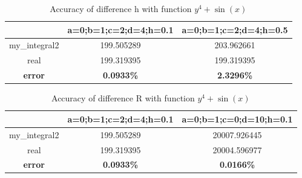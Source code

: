 \documentclass[
	12pt, %
]{fphw}
\numberwithin{equation}{section}
\numberwithin{figure}{section}
\numberwithin{table}{section}
\begin{document}
\begin{table}
	\centering
	\caption{Accuracy of difference h with function $y^4+\sin(x)$}
	\label{table1}
	\begin{tabular}{ccc}
		\toprule
		               & a=0;b=1;c=2;d=4;h=0.1 & a=0;b=1;c=2;d=4;h=0.5 \\
		\midrule
		my\_integral2  & 199.505289            & 203.962661            \\
		real           & 199.319395            & 199.319395            \\
		\textbf{error} & \textbf{0.0933\%}     & \textbf{2.3296\%}     \\
		\bottomrule
	\end{tabular}
\end{table}

\begin{table}
	\centering
	\caption{Accuracy of difference R with function $y^4+\sin(x)$}
	\label{table2}
	\begin{tabular}{ccc}
		\toprule
		               & a=0;b=1;c=2;d=4;h=0.1 & a=0;b=1;c=0;d=10;h=0.1 \\
		\midrule
		my\_integral2  & 199.505289            & 20007.926445           \\
		real           & 199.319395            & 20004.596977           \\
		\textbf{error} & \textbf{0.0933\%}     & \textbf{0.0166\%}      \\
		\bottomrule
	\end{tabular}
\end{table}
\clearpage
\newpage

 
\end{document}
